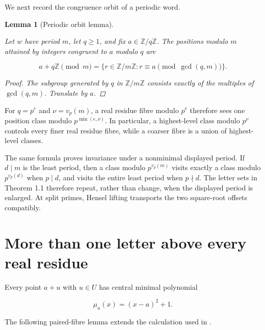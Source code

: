 \documentclass[11pt]{article}
\newtheorem{lemma}[theorem]{Lemma}
\numberwithin{equation}{section}
\begin{document}
We next record the congruence orbit of a periodic word.

\begin{lemma}[Periodic orbit lemma]
\label{lem:periodic-orbit}

Let $w$ have period $m$, let $q\ge1$, and fix
$a\in\mathbb Z/q\mathbb Z$. The positions modulo $m$ attained by integers
congruent to $a$ modulo $q$ are

\nopagebreak[4]
\[
a+q\mathbb Z\pmod m
=\{r\in\mathbb Z/m\mathbb Z:r\equiv a
  \pmod {\gcd(q,m)}\}.
\]

\begin{proof}

The subgroup generated by $q$ in $\mathbb Z/m\mathbb Z$ consists exactly
of the multiples of $\gcd(q,m)$. Translate by $a$.
\end{proof}

\end{lemma}


For $q=p^e$ and $\nu=v_p(m)$, a real residue fibre modulo $p^e$ therefore
sees one position class modulo $p^{\min(e,\nu)}$. In particular, a
highest-level class modulo $p^\nu$ controls every finer real residue fibre,
while a coarser fibre is a union of highest-level classes.

The same formula proves invariance under a nonminimal displayed period. If
$d\mid m$ is the least period, then a class modulo $p^{v_p(m)}$ visits
exactly a class modulo $p^{v_p(d)}$ when $p\mid d$, and visits the entire
least period when $p\nmid d$. The letter sets in Theorem 1.1 therefore
repeat, rather than change, when the displayed period is enlarged. At split
primes, Hensel lifting transports the two square-root offsets compatibly.

\section{More than one letter above every real residue}


Every point $a+u$ with $u\in U$ has central minimal polynomial

\nopagebreak[4]
\[
\mu_a(x)=(x-a)^2+1.
\]

The following paired-fibre lemma extends the calculation used in \cite{carptopus-squarefree,carptopus-odd}.
\end{document}
